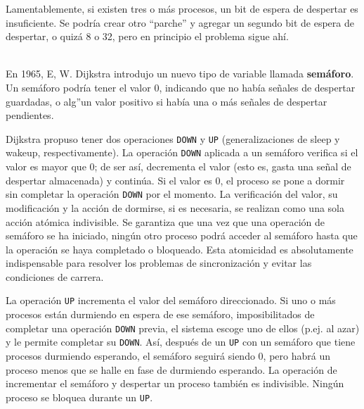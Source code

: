 \documentclass{article}
\begin{document}
Lamentablemente, si existen tres o m\'as procesos, un bit de espera de 
despertar es insuficiente. Se podr\'ia crear otro ``parche'' y agregar 
un segundo bit de espera de despertar, o quiz\'a 8 o 32, pero en 
principio el problema sigue ah\'i.

\\
En 1965, E, W. Dijkstra introdujo un nuevo tipo de variable llamada 
{\bf sem\'aforo}. Un sem\'aforo podr\'ia tener el valor 0, indicando 
que no hab\'ia se\~nales de despertar guardadas, o alg''un valor positivo 
si hab\'ia una o m\'as se\~nales de despertar pendientes. 

Dijkstra propuso tener dos operaciones {\tt DOWN} y {\tt UP} 
(generalizaciones de sleep y wakeup, respectivamente). La operaci\'on 
{\tt DOWN} aplicada a un sem\'aforo verifica si el valor es mayor que 
0; de ser as\'i, decrementa el valor (esto es, gasta una se\~nal de 
despertar almacenada) y contin\'ua. Si el valor es 0, el proceso se 
pone a dormir sin completar la operaci\'on {\tt DOWN} por el momento. 
La verificaci\'on del valor, su modificaci\'on y la acci\'on de dormirse,  
si es necesaria, se realizan como una sola {acci\'on at\'omica} indivisible. 
Se garantiza que una vez que una operaci\'on de sem\'aforo se ha iniciado, 
ning\'un otro proceso podr\'a acceder al sem\'aforo hasta que la operaci\'on 
se haya completado o bloqueado. Esta atomicidad es absolutamente indispensable 
para resolver los problemas de sincronizaci\'on y evitar las condiciones de 
carrera.

La operaci\'on {\tt UP} incrementa el valor del sem\'aforo direccionado. Si uno 
o m\'as procesos est\'an durmiendo en espera de ese sem\'aforo, imposibilitados 
de completar una operaci\'on {\tt DOWN} previa, el sistema escoge uno de 
ellos (p.ej. al azar) y le permite completar su {\tt DOWN}. As\'i, despu\'es de 
un {\tt UP} con un sem\'aforo que tiene procesos durmiendo esperando, el 
sem\'aforo seguir\'a siendo 0, pero habr\'a un proceso menos que se halle 
en fase de durmiendo esperando. La operaci\'on de incrementar el sem\'aforo 
y despertar un proceso tambi\'en es indivisible. Ning\'un proceso se bloquea 
durante un {\tt UP}.
\end{document}
